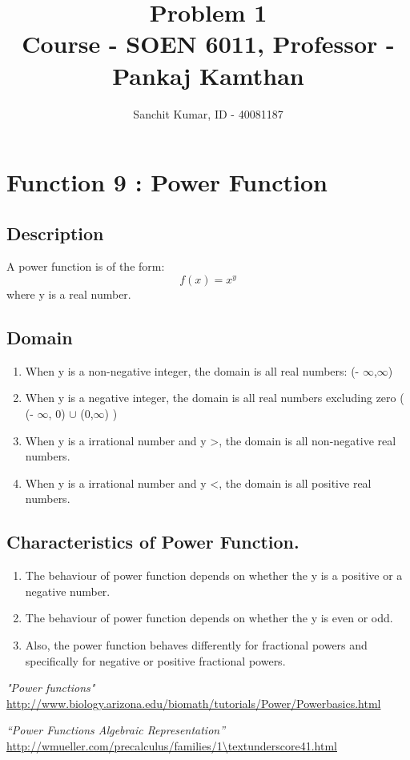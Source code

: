 \documentclass[a4paper,12pt]{article}
\title{Problem 1\\
		\large Course - SOEN 6011, Professor - Pankaj Kamthan}
\author{Sanchit Kumar, ID - 40081187}
\begin{document}
\maketitle %

\section{\large Function 9 : Power Function}

\subsection{Description}
A power function is of the form:
\begin{equation} \label{Power_func}
	f(x) = x^y
\end{equation}
where y is a real number.


\subsection{Domain}
\begin{enumerate}
\item When y is a non-negative integer, the domain is all real numbers:  (- $\infty$,$\infty$)

\item When y is a negative integer, the domain is all real numbers excluding zero ( (- $\infty$, 0) $\cup$ (0,$\infty$) )

\item When y is a irrational number and y \textgreater {}, the domain is all non-negative real numbers.

\item When y is a irrational number and y \textless {}, the domain is all positive real numbers. 
\end{enumerate}


\subsection{Characteristics of Power Function.}
\begin{enumerate}
\item The behaviour of power function depends on whether the y is a positive or a negative number.
\item The behaviour of power function depends on whether the y is even or odd.
\item Also, the power function behaves differently for fractional powers and specifically for negative or positive fractional powers.
\end{enumerate}


\begin{thebibliography}{9}
	 \emph{"Power functions"} \url{http://www.biology.arizona.edu/biomath/tutorials/Power/Powerbasics.html}
	
	 \emph{“Power Functions Algebraic Representation”} \url{http://wmueller.com/precalculus/families/1\textunderscore41.html} 
	
\end{thebibliography}
\end{document}
